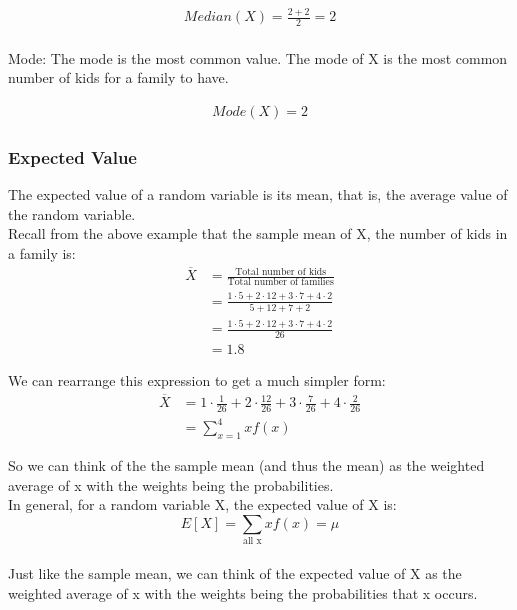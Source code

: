 \documentclass[12pt, letterpaper]{article}
\begin{document}
\begin{align*}
Median(X) = \frac{2 + 2}{2} = 2
\end{align*}\\

Mode: The mode is the most common value. The mode of X is the most common number of kids for a family to have.

\begin{align*}
Mode(X) = 2
\end{align*}

\subsubsection{Expected Value}
The expected value of a random variable is its mean, that is, the average value of the random variable.\\

Recall from the above example that the sample mean of X, the number of kids in a family is:
\begin{align*}
\overline{X} &= \frac{\text{Total number of kids}}{\text{Total number of families}}\\
&= \frac{1 \cdot 5 + 2 \cdot 12 + 3 \cdot 7 + 4 \cdot 2 }{5 + 12 + 7 + 2}\\
&= \frac{1 \cdot 5 + 2 \cdot 12 + 3 \cdot 7 + 4 \cdot 2 }{26}\\
&= 1.8
\end{align*}

We can rearrange this expression to get a much simpler form:
\begin{align*}
\overline{X} &= 1 \cdot \frac{1}{26} + 2 \cdot \frac{12}{26} + 3 \cdot \frac{7}{26} + 4 \cdot \frac{2}{26}\\
&= \sum_{x = 1}^4 x f\left(x\right)
\end{align*}

So we can think of the the sample mean (and thus the mean) as the weighted average of x with the weights being the probabilities.\\

In general, for a random variable X, the expected value of X is:
\begin{equation}
E[X] = \sum_{\text{all x}} xf\left(x\right) = \mu
\end{equation}\\

Just like the sample mean, we can think of the expected value of X as the weighted average of x with the weights being the probabilities that x occurs.\\
\end{document}
